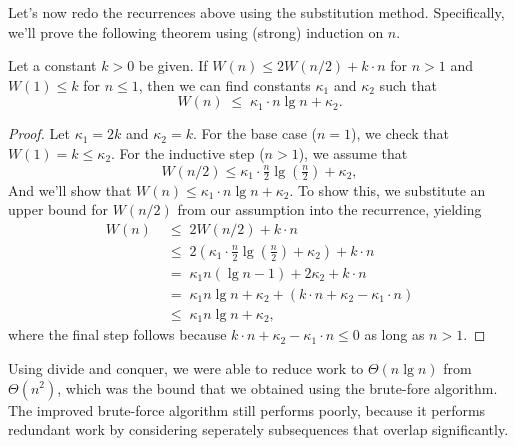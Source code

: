 \begin{gram}
Let's now redo the recurrences above using the substitution method.
%
Specifically, we'll prove the following theorem using (strong)
induction on $n$.
%
\end{gram}

\begin{flex}
\begin{theorem}
  Let a constant $k > 0$ be given.  If $W(n) \leq 2 W(n/2) + k \cdot n$ for $n >
  1$ and $W(1) \leq k$ for $n \leq 1$, then we can find constants $\kappa_1$ and
  $\kappa_2$ such that \[ W(n) \;\leq\; \kappa_1 \cdot n \lg n + \kappa_2.\]
\end{theorem}

\begin{proof}
  Let $\kappa_1 = 2k$ and $\kappa_2 = k$.  For the base case ($n=1$), we check
  that $W(1) = k \leq \kappa_2$.  For the inductive step ($n>1$), we assume that
  \[
  W(n/2) \leq \kappa_1 \cdot \tfrac{n}2 \lg (\tfrac{n}2) + \kappa_2,
  \]
  And we'll show that $W(n) \leq \kappa_1 \cdot n \lg n + \kappa_2$.  To show
  this, we substitute an upper bound for $W(n/2)$ from our assumption into the
  recurrence, yielding
  \begin{align*}
    W(n) \;&\leq\; 2W(n/2) + k \cdot n  \\
    \;&\leq\; 2(\kappa_1 \cdot \tfrac{n}2 \lg (\tfrac{n}2) + \kappa_2) + k \cdot n\\
    \;&=\; \kappa_1 n (\lg n - 1) + 2 \kappa_2 + k \cdot n\\
    \;&=\; \kappa_1 n \lg n + \kappa_2 + (k \cdot n + \kappa_2 - \kappa_1 \cdot n)\\
    \;&\leq\; \kappa_1 n \lg n + \kappa_2,
  \end{align*}
  where the final step follows because $k \cdot n + \kappa_2 - \kappa_1 \cdot n \leq
  0$ as long as $n > 1$.
\end{proof}
\end{flex}

\begin{teachnote}
Using divide and conquer, we were able to reduce work to
$\Theta(n\lg{n})$ from $\Theta(n^2)$, which was the bound that we
obtained using the brute-fore algorithm.
%
%
The improved brute-force algorithm still performs poorly, because it
performs  redundant work by considering seperately subsequences
that overlap significantly.  
%
\end{teachnote}


